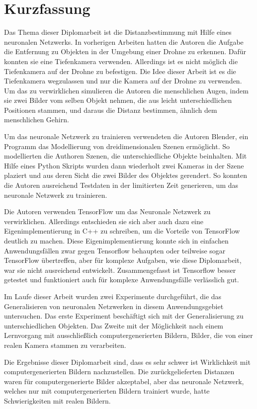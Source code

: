 \chapter{Kurzfassung}

Das Thema dieser Diplomarbeit ist die Distanzbestimmung mit Hilfe eines neuronalen Netzwerks. In vorherigen Arbeiten hatten die Autoren die Aufgabe die Entfernung zu Objekten in der Umgebung einer Drohne zu erkennen. Dafür konnten sie eine Tiefenkamera verwenden. Allerdings ist es nicht möglich die Tiefenkamera auf der Drohne zu befestigen. Die Idee dieser Arbeit ist es die Tiefenkamera wegzulassen und nur die Kamera auf der Drohne zu verwenden. Um das zu verwirklichen simulieren die Autoren die menschlichen Augen, indem sie zwei Bilder vom selben Objekt nehmen, die aus leicht unterschiedlichen Positionen stammen, und daraus die Distanz bestimmen, ähnlich dem menschlichen Gehirn.

Um das neuronale Netzwerk zu trainieren verwendeten die Autoren Blender, ein Programm das Modellierung von dreidimensionalen Szenen ermöglicht. So modellierten die Authoren Szenen, die unterschiedliche Objekte beinhalten. Mit Hilfe eines Python Skripts wurden dann wiederholt zwei Kameras in der Szene plaziert und aus deren Sicht die zwei Bilder des Objektes gerendert. So konnten die Autoren ausreichend Testdaten in der limitierten Zeit generieren, um das neuronale Netzwerk zu trainieren.

Die Autoren verwenden TensorFlow um das Neuronale Netzwerk zu verwirklichen. Allerdings entschieden sie sich aber auch dazu eine Eigenimplementierung in C++ zu schreiben, um die Vorteile von TensorFlow deutlich zu machen. Diese Eigenimplementierung konnte sich in einfachen Anwendungsfällen zwar gegen Tensorflow behaupten oder teilweise sogar TensorFlow übertreffen, aber für komplexe Aufgaben, wie diese Diplomarbeit, war sie nicht ausreichend entwickelt. Zusammengefasst ist Tensorflow besser getestet und funktioniert auch für komplexe Anwendungsfälle verlässlich gut.

Im Laufe dieser Arbeit wurden zwei Experimente durchgeführt, die das Generalisieren von neuronalen Netzwerken in diesem Anwendungsgebiet untersuchen. Das erste Experiment beschäftigt sich mit der Generalisierung zu unterschiedlichen Objekten. Das Zweite mit der Möglichkeit nach einem Lernvorgang mit ausschließlich computergenerierten Bildern, Bilder, die von einer realen Kamera stammen zu verarbeiten.

Die Ergebnisse dieser Diplomarbeit sind, dass es sehr schwer ist Wirklichkeit mit computergenerierten Bildern nachzustellen. Die zurückgelieferten Distanzen waren für computergenerierte Bilder akzeptabel, aber das neuronale Netzwerk, welches nur mit computergenerierten Bildern trainiert wurde, hatte Schwierigkeiten mit realen Bildern.


